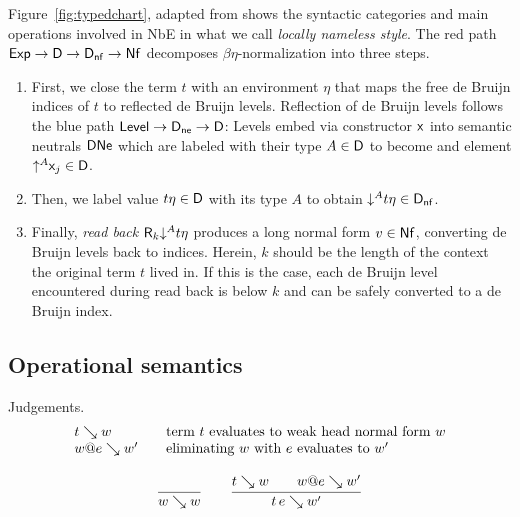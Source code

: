 \documentclass[acmlarge,review,anonymous]{acmart}\settopmatter{printfolios=true}
\begin{document}
Figure~\ref{fig:typedchart}, adapted from \citet{abel:habil} shows the syntactic categories and main operations involved in NbE in what we call \emph{locally nameless style}.  The red path $\mathsf{Exp} \to \mathsf{D} \to \mathsf{D}_{\mathsf{nf}} \to \mathsf{Nf}$ decomposes $\beta\eta$-normalization into three steps.
\begin{enumerate}
\item
First, we close the term $t$ with an environment $\eta$ that maps the free de Bruijn indices of $t$ to reflected de Bruijn levels.  Reflection of de Bruijn levels follows the blue path $\mathsf{Level} \to \mathsf{D}_{\mathsf{ne}} \to \mathsf{D}$: Levels embed via constructor $\mathsf{x}_{}$ into semantic neutrals $\mathsf{DNe}$ which are labeled with their type $A \in \mathsf{D}$ to become and element $\mathord{\uparrow^{A}} \mathsf{x}_{j} \in \mathsf{D}$.

\item
Then, we label value $t \eta \in \mathsf{D}$ with its type $A$ to obtain $\mathord{\downarrow^{A}} t \eta \in \mathsf{D}_{\mathsf{nf}}$.
\item
Finally, \emph{read back} %
$\mathsf{R}_k \mathord{\downarrow^{A}} t\eta$ produces a long normal form $v \in \mathsf{Nf}$, converting de Bruijn levels back to indices.
Herein, $k$ should be the length of the context the original term $t$ lived in.
If this is the case, each de Bruijn level encountered during read back is below $k$ and can be safely converted to a de Bruijn index.
\end{enumerate}

\subsection{Operational semantics}

Judgements.
\[
\begin{array}{l@{\qquad}l}
  t \evalsto w & \mbox{term $t$ evaluates to weak head normal form $w$} \\
  w @ e \evalsto w' & \mbox{eliminating $w$ with $e$ evaluates to $w'$} \\
\end{array}
\]

\begin{gather*}
  \ru{}{w \evalsto w}
\qquad
  \ru{t \evalsto w \qquad w @ e \evalsto w'}{t\,e \evalsto w'}
\end{gather*}

\end{document}
